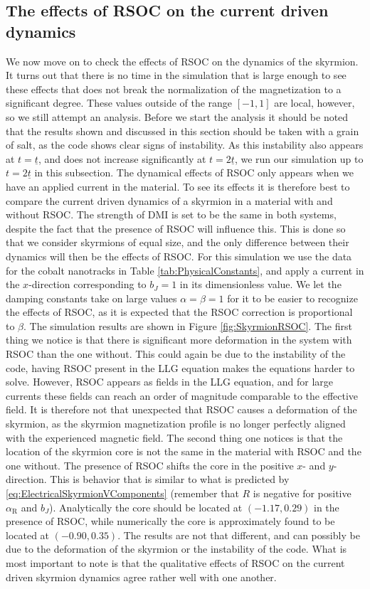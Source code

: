 \subsection{The effects of RSOC on the current driven dynamics}
We now move on to check the effects of RSOC on the dynamics of the skyrmion. It turns out that there is no time in the simulation that is large enough to see these effects that does not break the normalization of the magnetization to a significant degree. These values outside of the range $\left[-1,1\right]$ are local, however, so we still attempt an analysis. Before we start the analysis it should be noted that the results shown and discussed in this section should be taken with a grain of salt, as the code shows clear signs of instability. As this instability also appears at $t=\underline{t}$, and does not increase significantly at $t=2\underline{t}$, we run our simulation up to $t=2\underline{t}$ in this subsection. The dynamical effects of RSOC only appears when we have an applied current in the material. To see its effects it is therefore best to compare the current driven dynamics of a skyrmion in a material with and without RSOC. The strength of DMI is set to be the same in both systems, despite the fact that the presence of RSOC will influence this. This is done so that we consider skyrmions of equal size, and the only difference between their dynamics will then be the effects of RSOC. For this simulation we use the data for the cobalt nanotracks in Table \ref{tab:PhysicalConstants}, and apply a current in the $x$-direction corresponding to $b_J = 1$ in its dimensionless value. We let the damping constants take on large values $\alpha=\beta=1$ for it to be easier to recognize the effects of RSOC, as it is expected that the RSOC correction is proportional to $\beta$. The simulation results are shown in Figure \ref{fig:SkyrmionRSOC}. The first thing we notice is that there is significant more deformation in the system with RSOC than the one without. This could again be due to the instability of the code, having RSOC present in the LLG equation makes the equations harder to solve. However, RSOC appears as fields in the LLG equation, and for large currents these fields can reach an order of magnitude comparable to the effective field. It is therefore not that unexpected that RSOC causes a deformation of the skyrmion, as the skyrmion magnetization profile is no longer perfectly aligned with the experienced magnetic field. The second thing one notices is that the location of the skyrmion core is not the same in the material with RSOC and the one without. The presence of RSOC shifts the core in the positive $x$- and $y$-direction. This is behavior that is similar to what is predicted by \eqref{eq:ElectricalSkyrmionVComponents} (remember that $R$ is negative for positive $\alpha_{\text{R}}$ and $b_J$). Analytically the core should be located at $\left(-1.17, 0.29\right)$ in the presence of RSOC, while numerically the core is approximately found to be located at $\left(-0.90, 0.35\right)$. The results are not that different, and can possibly be due to the deformation of the skyrmion or the instability of the code. What is most important to note is that the qualitative effects of RSOC on the current driven skyrmion dynamics agree rather well with one another.
